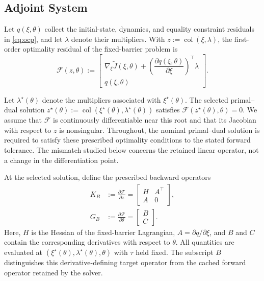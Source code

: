 \documentclass[letterpaper,10pt,conference]{ieeeconf}
\begin{document}
\subsection{Adjoint System}

Let $q(\xi,\theta)$ collect the initial-state, dynamics, and equality
constraint residuals in \eqref{eq:ocp}, and let $\lambda$ denote their
multipliers. With $z:=\operatorname{col}(\xi,\lambda)$, the first-order
optimality residual of the fixed-barrier problem is
\begin{equation}
\mathcal F(z,\theta):=
\begin{bmatrix}
\nabla_\xi\widetilde J(\xi,\theta)
+
\left(
\dfrac{\partial q(\xi,\theta)}{\partial\xi}
\right)^\top\lambda\\[3pt]
q(\xi,\theta)
\end{bmatrix}.
\label{eq:optimality_residual}
\end{equation}

Let $\lambda^\star(\theta)$ denote the multipliers associated with
$\xi^\star(\theta)$. The selected primal--dual solution
$z^\star(\theta):=\operatorname{col}(\xi^\star(\theta),
\lambda^\star(\theta))$ satisfies
$\mathcal F(z^\star(\theta),\theta)=0$.
We assume that $\mathcal F$ is continuously differentiable near this
root and that its Jacobian with respect to $z$ is nonsingular.
Throughout, the nominal primal--dual solution is required to satisfy
these prescribed optimality conditions to the stated forward tolerance.
The mismatch studied below concerns the retained linear operator, not a
change in the differentiation point.

At the selected solution, define the prescribed backward operators
\begin{equation}
\begin{aligned}
K_B
&:=
\frac{\partial\mathcal F}{\partial z}
=
\begin{bmatrix}
H & A^\top\\
A & 0
\end{bmatrix},\\
G_B
&:=
\frac{\partial\mathcal F}{\partial\theta}
=
\begin{bmatrix}
B\\
C
\end{bmatrix}.
\end{aligned}
\label{eq:target_derivatives}
\end{equation}
Here, $H$ is the Hessian of the fixed-barrier Lagrangian,
$A=\partial q/\partial\xi$, and $B$ and $C$ contain the corresponding
derivatives with respect to $\theta$. All quantities are evaluated at
$(\xi^\star(\theta),\lambda^\star(\theta),\theta)$ with $\tau$ held
fixed. The subscript $B$ distinguishes this derivative-defining target
operator from the cached forward operator retained by the solver.
\end{document}
